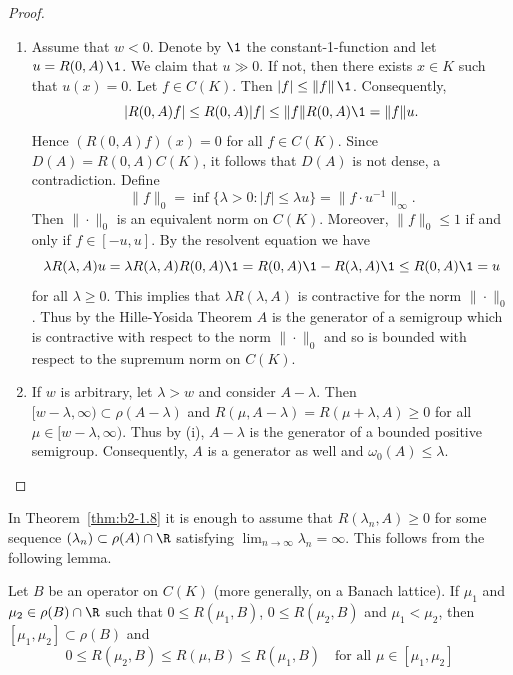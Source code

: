 \begin{proof} 
\begin{enumerate}[\upshape (i), wide, labelindent=.25em]
\item \label{thm:b2-1.8-1}
Assume that $w < 0$.
Denote by $\1$ the constant-1-function and let $u = R(0,A)\,\1$.
We claim that $u \gg 0$.
If not, then there exists $x \in K$ such that $u(x) = 0$.
Let $f \in C(K)$.
Then $|f| \leq \|f\| \, \1$.
Consequently, 
%
\[
	\vert R(0,A)f \vert \leq R(0,A)|f| \leq \|f\|R(0,A)\1 = \|f\|u.
\]
%
Hence $(R(0,A)f)(x) = 0$ for all $f \in C(K)$.
Since $D(A) = R(0,A)C(K)$, it follows that $D(A)$ is not dense, a contradiction.
Define 
\[\|f\|_{0} = \inf \{\lambda > 0 \colon |f| \leq \lambda u\} = \|f \cdot u^{-1} \|_{\infty}.
\]
Then $\|\cdot\|_{0}$ is an equivalent norm on $C(K)$.
Moreover, $\|f\|_{0} \leq 1$ if and only if\/ $f \in [-u,u]$.
By the resolvent equation we have 
\[
\lambda R(\lambda,A)u = \lambda R(\lambda,A)R(0,A)\1 = R(0,A)\1 - R(\lambda,A)\1 \leq R(0,A)\1 = u 
\]
for all $\lambda \geq 0$.
This implies that $\lambda R(\lambda,A)$ is contractive for the norm $\|\cdot\|_{0}$.
Thus by the Hille-Yosida Theorem $A$ is the generator of a semigroup which is contractive with respect to the norm $\|\cdot\|_{0}$ and so is bounded with respect to the supremum norm on $C(K)$.

\item \label{thm:b2-1.8-2}
If\/ $w$ is arbitrary, let $\lambda > w$ and consider $A - \lambda$.
Then $[w-\lambda,\infty) \subset \rho(A-\lambda)$ and $R(\mu,A-\lambda) = R(\mu+\lambda,A) \geq 0$ for all $\mu \in [w-\lambda,\infty)$.
Thus by (i), $A - \lambda$ is the generator of a bounded positive semigroup.
Consequently, $A$ is a generator as well and $\omega_{0}(A) \leq \lambda$.
\qedhere
\end{enumerate}
\end{proof}
In Theorem~\ref{thm:b2-1.8} it is enough to assume that $R(\lambda_{n},A) \geq 0$ for some sequence 
 $(\lambda_{n}) \subset \rho(A) \cap \R$ satisfying $\lim_{n \to \infty} \lambda_{n} = \infty$.
This follows from the following lemma.
\begin{lemma}\label{lem:b2-1.9}
Let $B$ be an operator on $C(K)$ (more generally, on a Banach lattice).
If\/ $\mu_{1}$ and $\mu_{2} \in \rho(B) \cap \R$ such that $0 \leq R(\mu_{1},B)$, $0 \leq R(\mu_{2},B)$ and $\mu_{1} < \mu_{2}$, then $[\mu_{1},\mu_{2}] \subset \rho(B)$ and
\[
    0 \leq R(\mu_{2},B) \leq R(\mu,B) \leq R(\mu_{1},B) \quad \text{for all } \mu \in [\mu_{1},\mu_{2}]
\]
\end{lemma}
